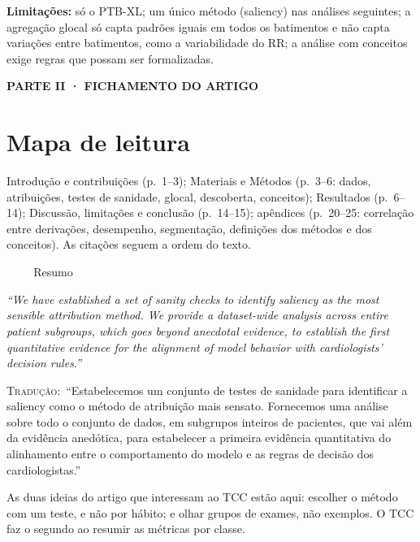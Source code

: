 \documentclass[11pt,a4paper]{article}
\newcommand{\pagechip}[1]{{\setlength{\fboxsep}{1.5pt}\colorbox{cAcc}{\textcolor{white}{\scriptsize\texttt{#1}}}}}
\newcommand{\partbar}[1]{\par\vspace{1.2em}\noindent\colorbox{black!80}{\parbox{\dimexpr\linewidth-2\fboxsep}{\color{white}\bfseries\sffamily\MakeUppercase{#1}}}\par\vspace{0.4em}}
\newenvironment{origquote}{\par\itshape\small}{\par}
\newenvironment{tradquote}{\par\small\textsc{Tradução:}\ }{\par}
\newcommand{\explab}[1]{\par\smallskip{\small\color{cAcc}\textbf{\MakeUppercase{#1}}}\par}
\begin{document}
\textbf{Limitações:} só o PTB-XL; um único método (saliency) nas análises seguintes; a agregação glocal só capta padrões iguais em todos os batimentos e não capta variações entre batimentos, como a variabilidade do RR; a análise com conceitos exige regras que possam ser formalizadas.

\partbar{Parte II · Fichamento do artigo}

\section{Mapa de leitura}
Introdução e contribuições (p.~1--3); Materiais e Métodos (p.~3--6: dados, atribuições, testes de sanidade, glocal, descoberta, conceitos); Resultados (p.~6--14); Discussão, limitações e conclusão (p.~14--15); apêndices (p.~20--25: correlação entre derivações, desempenho, segmentação, definições dos métodos e dos conceitos). As citações seguem a ordem do texto.

\begin{citacard}{\pagechip{p. 1} Resumo}
\begin{origquote}“We have established a set of sanity checks to identify saliency as the most sensible attribution method. We provide a dataset-wide analysis across entire patient subgroups, which goes beyond anecdotal evidence, to establish the first quantitative evidence for the alignment of model behavior with cardiologists’ decision rules.”\end{origquote}
\begin{tradquote}“Estabelecemos um conjunto de testes de sanidade para identificar a saliency como o método de atribuição mais sensato. Fornecemos uma análise sobre todo o conjunto de dados, em subgrupos inteiros de pacientes, que vai além da evidência anedótica, para estabelecer a primeira evidência quantitativa do alinhamento entre o comportamento do modelo e as regras de decisão dos cardiologistas.”\end{tradquote}
\explab{Explicação}
As duas ideias do artigo que interessam ao TCC estão aqui: escolher o método com um teste, e não por hábito; e olhar grupos de exames, não exemplos. O TCC faz o segundo ao resumir as métricas por classe.
\end{citacard}
\end{document}

